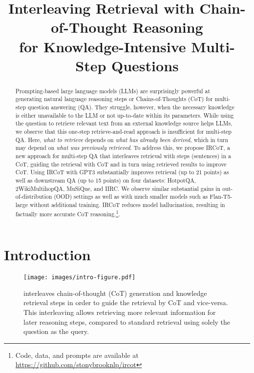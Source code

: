 \title{\icon Interleaving Retrieval with Chain-of-Thought Reasoning\\ for Knowledge-Intensive Multi-Step Questions}



\maketitle

\begin{abstract}
Prompting-based large language models (LLMs) are surprisingly powerful at generating natural language reasoning steps or Chains-of-Thoughts (CoT) for multi-step question answering (QA). They struggle, however, when the necessary knowledge is either unavailable to the LLM or not up-to-date within its parameters. While using the question to retrieve relevant text from an external knowledge source helps LLMs, we observe that this one-step retrieve-and-read approach is insufficient for multi-step QA. Here, \textit{what to retrieve} depends on \textit{what has already been derived}, which in turn may depend on \textit{what was previously retrieved}. To address this, we propose IRCoT, a new approach for multi-step QA that interleaves retrieval with steps (sentences) in a CoT, guiding the retrieval with CoT and in turn using retrieved results to improve CoT. Using IRCoT with GPT3 substantially improves retrieval (up to 21 points) as well as downstream QA (up to 15 points) on four datasets: HotpotQA, 2WikiMultihopQA, MuSiQue, and IIRC. We observe similar substantial gains in out-of-distribution (OOD) settings as well as with much smaller models such as Flan-T5-large without additional training. IRCoT reduces model hallucination, resulting in factually more accurate CoT reasoning.\footnote{Code, data, and prompts are available at \url{https://github.com/stonybrooknlp/ircot}}.
\end{abstract}
\section{Introduction}

\begin{figure}[t]
\centering
\texttt{[image: images/intro-figure.pdf]}
\caption{
\iconsys interleaves chain-of-thought (CoT) generation and knowledge retrieval steps in order to guide the retrieval by CoT and vice-versa. This interleaving allows retrieving more relevant information for later reasoning steps, compared to standard retrieval using solely the question as the query.}
\label{fig:intro-figure}
\end{figure}


